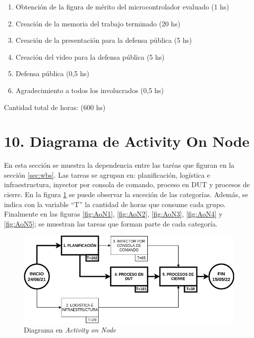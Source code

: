 \documentclass[
11pt, %
]{charter}
\begin{document}
\begin{enumerate}
\begin{enumerate}
		\item Obtención de la figura de mérito del microcontrolador evaluado (1 hs)
		\item Creación de la memoria del trabajo terminado (20 hs)
		\item Creación de la presentación para la defensa pública (5 hs)
		\item Creación del video para la defensa pública (5 hs)
		\item Defensa pública (0,5 hs)
		\item Agradecimiento a todos los involucrados (0,5 hs)
	\end{enumerate}
\end{enumerate}

Cantidad total de horas: (600 hs)

\section{10. Diagrama de Activity On Node}
\label{sec:AoN}

En esta sección se muestra la dependencia entre las taréas que figuran en la sección \ref{sec:wbs}.
Las tareas se agrupan en: planificación, logística e infraestructura, inyector por consola de comando, proceso en DUT y procesos de cierre.
En la figura \ref{fig:AoN} se puede observar la suceción de las categorías.
Además, se indica con la variable ``T'' la cantidad de horas que consume cada grupo.
Finalmente en las figuras \ref{fig:AoN1}, \ref{fig:AoN2}, \ref{fig:AoN3}, \ref{fig:AoN4} y \ref{fig:AoN5}; se muestran las tareas que forman parte de cada categoría.

\begin{figure}[htpb]
\centering 
\includegraphics[width=.8\textwidth]{./Figuras/AoN.png}
\caption{Diagrama en \textit{Activity on Node}}
\label{fig:AoN}
\end{figure}
\end{document}

